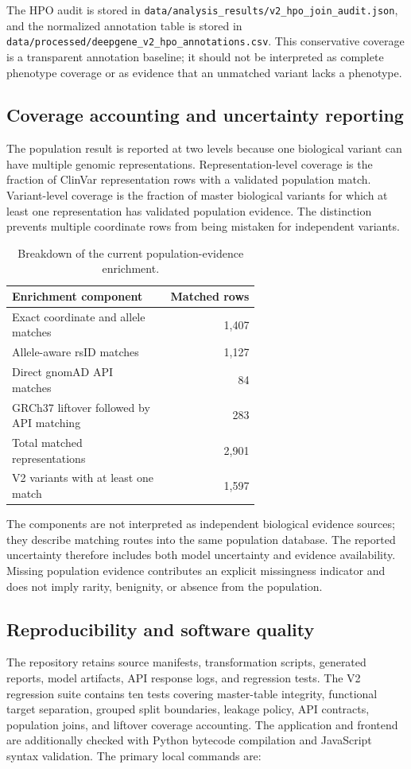 \documentclass[12pt,a4paper]{article}
\newcommand{\code}[1]{\nolinkurl{#1}}
\begin{document}
The HPO audit is stored in
\code{data/analysis\_results/v2\_hpo\_join\_audit.json}, and the normalized
annotation table is stored in
\code{data/processed/deepgene\_v2\_hpo\_annotations.csv}. This conservative
coverage is a transparent annotation baseline; it should not be interpreted as
complete phenotype coverage or as evidence that an unmatched variant lacks a
phenotype.

\subsection{Coverage accounting and uncertainty reporting}
The population result is reported at two levels because one biological variant
can have multiple genomic representations. Representation-level coverage is
the fraction of ClinVar representation rows with a validated population match.
Variant-level coverage is the fraction of master biological variants for which
at least one representation has validated population evidence. The distinction
prevents multiple coordinate rows from being mistaken for independent variants.

\begin{table}[H]
\centering
\small
\caption{Breakdown of the current population-evidence enrichment.}
\label{tab:v2coveragebreakdown}
\begin{tabular}{p{0.62\linewidth}r}
\toprule
Enrichment component & Matched rows\\
\midrule
Exact coordinate and allele matches & 1,407\\
Allele-aware rsID matches & 1,127\\
Direct gnomAD API matches & 84\\
GRCh37 liftover followed by API matching & 283\\
Total matched representations & 2,901\\
V2 variants with at least one match & 1,597\\
\bottomrule
\end{tabular}
\end{table}

The components are not interpreted as independent biological evidence sources;
they describe matching routes into the same population database. The reported
uncertainty therefore includes both model uncertainty and evidence availability.
Missing population evidence contributes an explicit missingness indicator and
does not imply rarity, benignity, or absence from the population.

\subsection{Reproducibility and software quality}
The repository retains source manifests, transformation scripts, generated
reports, model artifacts, API response logs, and regression tests. The V2
regression suite contains ten tests covering master-table integrity, functional
target separation, grouped split boundaries, leakage policy, API contracts,
population joins, and liftover coverage accounting. The application and
frontend are additionally checked with Python bytecode compilation and
JavaScript syntax validation. The primary local commands are:
\end{document}
